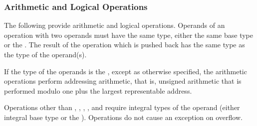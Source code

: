 \subsubsection{Arithmetic and Logical Operations}
The following provide arithmetic and logical operations.
Operands of an operation with two operands
must have the same type,
either the same base type or the \generictype.
The result of the operation which is pushed back has the same type
as the type of the operand(s).

If the type of the operands is the \generictype,
except as otherwise specified, the arithmetic operations
perform addressing arithmetic, that is, unsigned arithmetic that is performed
modulo one plus the largest representable address.

Operations other than \DWOPabs{},
\DWOPdiv{}, \DWOPminus{}, \DWOPmul{}, \DWOPneg{} and \DWOPplus{}
require integral types of the operand (either integral base type
or the \generictype).  Operations do not cause an exception
on overflow.

